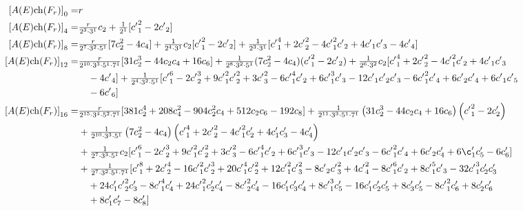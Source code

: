 \documentclass{amsart}
\theoremstyle{plain}
\newcommand{\ch}{\mathrm{ch}}
\numberwithin{equation}{section}
\begin{document}
%	


\begin{tcolorbox}[text width=16cm, height=7.6cm,
title=Twisted \^{A}-genus in terms of Chern classes]
{\footnotesize
\begin{align*}
{[A(E)\ch(F_r)]}_0 = &r
\\
 {[A(E)\ch(F_r)]}_4 = &\tfrac{r}{2^3\cdot 3^1} c_2
 +\tfrac{1}{2^1}[ {c'}_1^2-2 {c'}_2]
\\
 {[A(E)\ch(F_r)]}_8 = & \tfrac{r}{2^7\cdot 3^2\cdot 5^1}[7 c_2^2-4 c_4]
 +\tfrac{1}{2^4\cdot 3^1} c_2 [{c'}_1^2-2 {c'}_2]+
 \tfrac{1}{2^3\cdot 3^1} [{c'}_1^4+2 {c'}_2^2-4  {c'}_1^2  {c'}_2
 +4 {c'}_1 {c'}_3-4 {c'}_4]
\\
 {[A(E)\ch(F_r)]}_{12} = &
 \tfrac{r}{2^{10}\cdot 3^3\cdot 5^1\cdot 7^1}[31 c_2^3-44 c_2 c_4+16 c_6]
  +\tfrac{1}{2^8\cdot 3^2\cdot 5^1}(7 c_2^2-4 c_4)({c'}_1^2-2 {c'}_2)
    +\tfrac{1}{2^6\cdot 3^2} c_2 [{c'}_1^4+2 {c'}_2^2-4 {c'}_1^2  {c'}_2
    +4 {c'}_1 {c'}_3

\\
& \quad
    -4 {c'}_4]
        +\tfrac{1}{2^4\cdot 3^2\cdot 5^1} [{c'}_1^6-2 {c'}_2^3+
 9  {c'}_1^2  {c'}_2^2+3  {c'}_3^2-6  {c'}_1^4
   {c'}_2+6  {c'}_1^3 
 {c'}_3-12 {c'}_1 {c'}_2  {c'}_3-6  {c'}_1^2
   {c'}_4+6 {c'}_2  {c'}_4+6  {c'}_1
   {c'}_5
\\
& \quad
-6 {c'}_6]
\\
 {[A(E)\ch(F_r)]}_{16} = &\tfrac{r}{2^{15}\cdot 3^4\cdot 5^2\cdot 7^1}
 [381 c_2^4+208 c_4^2-904 c_2^2c_4+512 c_2 c_6-192 c_8]
 +
\tfrac{1}{2^{11}\cdot 3^3\cdot 5^1\cdot 7^1}\left(31 c_2^3-44 c_2 c_4+16 c_6\right) 
\left( {c'}_1^2-2 c'_2\right)
\\
&
+
\tfrac{1}{2^{10}\cdot 3^3\cdot 5^1}\left(7 c_2^2-4 c_4\right) \left({c'}_1^4+2 {c'}_2^2-
4 {c'}_1^2 c'_2+4 c'_1 c'_3-4 c'_4\right)
\\
&
+
\tfrac{1}{2^7\cdot 3^3\cdot 5^1}c_2 [{c'}_1^6-2 {c'}_2^3+9 {c'}_1^2 {c'}_2^2+3 
 {c'}_3^2-6{ c'}_1^4 {c'}_2
 +6 {c'}_1^3 {c'}_3
 -12 {c'}_1 {c'}_2
 {c'}_3-6 {c'}_1^2 
{c'}_4+6 {c'}_2
 c'_4+6 \c'_1 
 c'_5-6 c'_6]
 \\
 &
 +
\tfrac{1}{2^7\cdot 3^2\cdot 5^1\cdot 7^1}[{c'}_1^8+2{c'}_2^4- 16 {c'}_1^2 
{c'}_2^3+ 
20 {c'}_1^4  {c'}_2^2
+ 12 {c'}_1^2  {c'}_3^2
- 8  {c'}_2  {c'}_3^2+4 
 {c'}_4^2
 - 8 {c'}_1^6 
 {c'}_2+ 8 {c'}_1^5  
 {c'}_3- 32 {c'}_1^3  c'_2  c'_3
\\
& \quad
+ 
 24 c'_1  {c'}_2^2  c'_3
 - 8 {c'}_1^4  
 c'_4
+ 24 {c'}_1^2 c'_2  c'_4
- 8  {c'}_2^2  c'_4- 
 16 c'_1 c'_3 c'_4 
 +8 {c'}_1^3
  c'_5-
16 c'_1   c'_2  c'_5
+ 8
    c'_3  c'_5
    - 8 
    {c'}_1^2  c'_6+ 8
   c'_2  c'_6
\\
& \quad
+ 8 
     c'_1 c'_7-8
      c'_8]
\end{align*} 
}
\end{tcolorbox}
\end{document}
